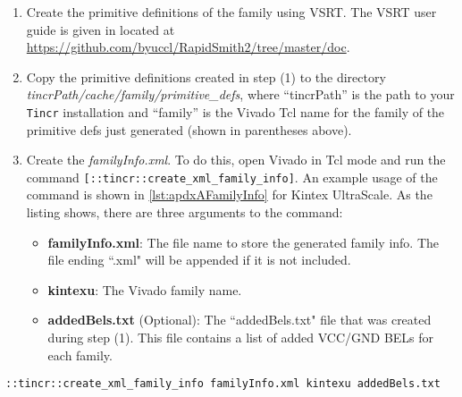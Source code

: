 \begin {enumerate}
  \item Create the primitive definitions of the family using VSRT. The VSRT user
  guide is given in located at {\color{blue}\url{
  https://github.com/byuccl/RapidSmith2/tree/master/doc}}.
  
  \item Copy the primitive definitions created in step (1) to the
   directory \textit{tincrPath/cache/family/primitive\_defs}, where
   ``tincrPath'' is the path to your \texttt{Tincr} installation and ``family''
   is the Vivado Tcl name for the family of the primitive defs just generated
   (shown in parentheses above).
   
   \item Create the \textit{familyInfo.xml}. To do this, open Vivado in Tcl mode
   and run the command \texttt{[::tin\-cr::create\-\_xml\_family\_info]}. An
   example usage of the command is shown in \autoref{lst:apdxAFamilyInfo} for
   Kintex UltraScale. As the listing shows, there are three arguments to the
   command:
   
	\begin{itemize}
	  \item \textbf{familyInfo.xml}: The file name to store the generated family
	  info. The file ending ``.xml" will be appended if it is not included.
	  \item \textbf{kintexu}: The Vivado family name.
	  \item \textbf{addedBels.txt} (Optional): The ``addedBels.txt" file that was
	  created during step (1). This file contains a list of added VCC/GND BELs for
	  each family.
	\end{itemize}    
\end{enumerate}

\begin{lstlisting}[numbers=none, caption=Family info example usage, label=lst:apdxAFamilyInfo] 
::tincr::create_xml_family_info familyInfo.xml kintexu addedBels.txt 
\end{lstlisting}


